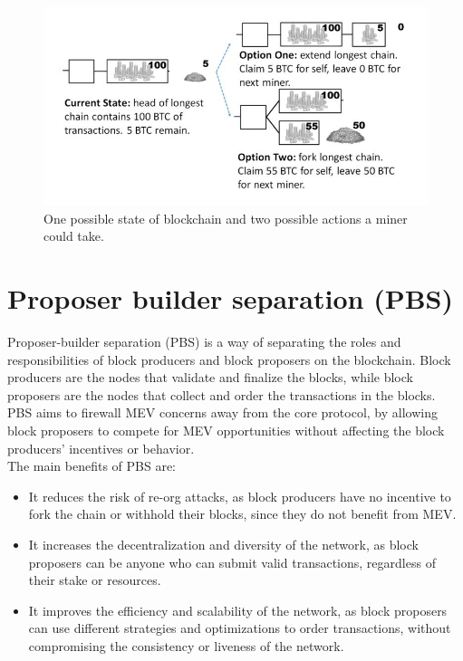\begin{center}
	\begin{figure}
		\centering
		\includegraphics[width=0.8\linewidth]{Fig/22/F2}
		\caption{One possible state of blockchain and two possible actions a miner could take.}
		\label{fig:L22_f2}
	\end{figure}
\end{center}
\section{Proposer builder separation (PBS)}
Proposer-builder separation (PBS) is a way of separating the roles and responsibilities of block producers and block proposers on the blockchain. Block producers are the nodes that validate and finalize the blocks, while block proposers are the nodes that collect and order the transactions in the blocks. PBS aims to firewall MEV concerns away from the core protocol, by allowing block proposers to compete for MEV opportunities without affecting the block producers’ incentives or behavior.\\
The main benefits of PBS are:
\begin{itemize}
	\item It reduces the risk of re-org attacks, as block producers have no incentive to fork the chain or withhold their blocks, since they do not benefit from MEV.
	\item It increases the decentralization and diversity of the network, as block proposers can be anyone who can submit valid transactions, regardless of their stake or resources.
	\item It improves the efficiency and scalability of the network, as block proposers can use different strategies and optimizations to order transactions, without compromising the consistency or liveness of the network.
\end{itemize}
